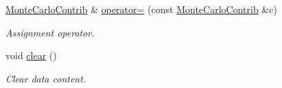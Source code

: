 \begin{DoxyCompactItemize}
\hyperlink{class_d_d4hep_1_1_simulation_1_1_geant4_hit_data_1_1_monte_carlo_contrib}{MonteCarloContrib} \& \hyperlink{class_d_d4hep_1_1_simulation_1_1_geant4_hit_data_1_1_monte_carlo_contrib_a99c408c786e0d76e316f223e08b194ed}{operator=} (const \hyperlink{class_d_d4hep_1_1_simulation_1_1_geant4_hit_data_1_1_monte_carlo_contrib}{MonteCarloContrib} \&c)
\begin{DoxyCompactList}\small\item\em Assignment operator. \item\end{DoxyCompactList}\item 
void \hyperlink{class_d_d4hep_1_1_simulation_1_1_geant4_hit_data_1_1_monte_carlo_contrib_af7e749692449e5c3294c3c60b5d056fe}{clear} ()
\begin{DoxyCompactList}\small\item\em Clear data content. \item\end{DoxyCompactList}\end{DoxyCompactItemize}
